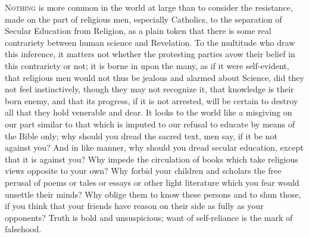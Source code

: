 N\textsc{othing} is more common in the world at large than to consider
the resistance, made on the part of religious men, especially
Catholics, to the separation of Secular Education from Religion, as a
plain token that there is some real contrariety between human science
and Revelation. To the multitude who draw this inference, it matters
not whether the protesting parties avow their belief in this
contrariety or not; it is borne in upon the many, as if it were
self-evident, that religious men would not thus be jealous and alarmed
about Science, did they not feel instinctively, though they may not
recognize it, that knowledge is their born enemy, and that its
progress, if it is not arrested, will be certain to destroy all that
they hold venerable and dear. It looks to the world like a misgiving
on our part similar to that which is imputed to our refusal to educate
by means of the Bible only; why should you dread the sacred text, men
say, if it be not against you? And in like manner, why should you
dread secular education, except that it is against you? Why impede the
circulation of books which take religious views opposite to your own?
Why forbid your children and scholars the free perusal of poems
or tales or essays or other light literature which you fear would
unsettle their minds? Why oblige them to know these persons and to
shun those, if you think that your friends have reason on their side
as fully as your opponents? Truth is bold and unsuspicious; want of
self-reliance is the mark of falsehood.

